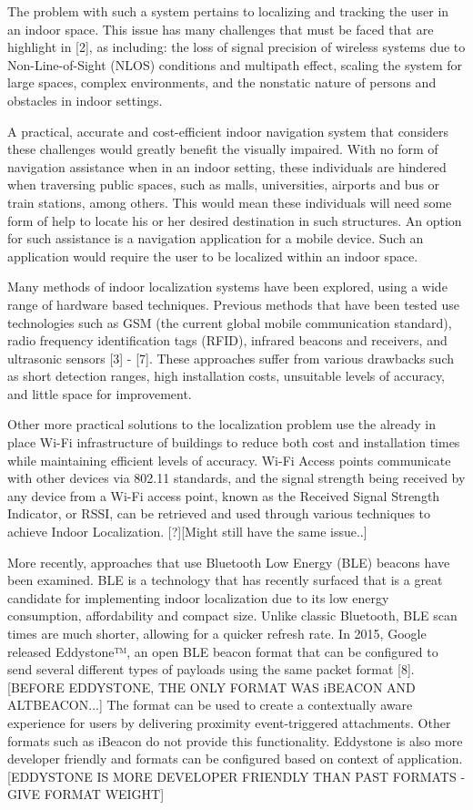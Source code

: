 \documentclass[conference]{IEEEtran}
\begin{document}
The problem with such a system pertains to localizing and tracking the user in an indoor space. This issue has many challenges that must be faced that are highlight in [2], as including: the loss of signal precision of wireless systems due to Non-Line-of-Sight (NLOS) conditions and multipath effect, scaling the system for large spaces, complex environments, and the nonstatic nature of persons and obstacles in indoor settings.

A practical, accurate and cost-efficient indoor navigation system that considers these challenges would greatly benefit the visually impaired. With no form of navigation assistance when in an indoor setting, these individuals are hindered when traversing public spaces, such as malls, universities, airports and bus or train stations, among others. This would mean these individuals will need some form of help to locate his or her desired destination in such structures. An option for such assistance is a navigation application for a mobile device. Such an application would require the user to be localized within an indoor space.

Many methods of indoor localization systems have been explored, using a wide range of hardware based techniques. Previous methods that have been tested use technologies such as GSM (the current global mobile communication standard), radio frequency identification tags (RFID), infrared beacons and receivers, and ultrasonic sensors [3] - [7]. These approaches suffer from various drawbacks such as short detection ranges, high installation costs, unsuitable levels of accuracy, and little space for improvement.

Other more practical solutions to the localization problem use the already in place Wi-Fi infrastructure of buildings to reduce both cost and installation times while maintaining efficient levels of accuracy. Wi-Fi Access points communicate with other devices via 802.11 standards, and the signal strength being received by any device from a Wi-Fi access point, known as the Received Signal Strength Indicator, or RSSI, can be retrieved and used through various techniques to achieve Indoor Localization. [?][Might still have the same issue..]

More recently, approaches that use Bluetooth Low Energy (BLE) beacons have been examined. BLE is a technology that has recently surfaced that is a great candidate for implementing indoor localization due to its low energy consumption, affordability and compact size. Unlike classic Bluetooth, BLE scan times are much shorter, allowing for a quicker refresh rate. In 2015, Google released Eddystone™, an open BLE beacon format that can be configured to send several different types of payloads using the same packet format [8]. [BEFORE EDDYSTONE, THE ONLY FORMAT WAS iBEACON AND ALTBEACON...] The format can be used to create a contextually aware experience for users by delivering proximity event-triggered attachments. Other formats such as iBeacon do not provide this functionality. Eddystone is also more developer friendly and formats can be configured based on context of application.[EDDYSTONE IS MORE DEVELOPER FRIENDLY THAN PAST FORMATS - GIVE FORMAT WEIGHT]
\end{document}
